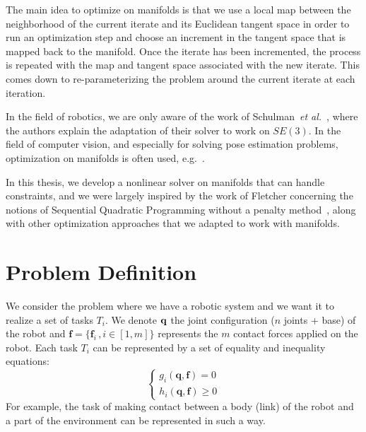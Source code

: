 The main idea to optimize on manifolds is that we use a local map between the neighborhood of the current iterate and its Euclidean tangent space in order to run an optimization step and choose an increment in the tangent space that is mapped back to the manifold.
Once the iterate has been incremented, the process is repeated with the map and tangent space associated with the new iterate.
This comes down to re-parameterizing the problem around the current iterate at each iteration.

In the field of robotics, we are only aware of the work of Schulman~\emph{et al.}~\cite{Schulman2014}, where the authors explain the adaptation of their solver to work on $SE(3)$.
In the field of computer vision, and especially for solving pose estimation problems, optimization on manifolds is often used, e.g.~\cite{hertzberg2011, lu2000fast}.

In this thesis, we develop a nonlinear solver on manifolds that can handle constraints, and we were largely inspired by the work of Fletcher concerning the notions of Sequential Quadratic Programming without a penalty method~\cite{Fletcher:ifip:2006, fletcher2010sequential, fletcher:mathprog:2000}, along with other optimization approaches that we adapted to work with manifolds.

\section{Problem Definition}
\label{sec:problem_definition}


We consider the problem where we have a robotic system and we want it to realize a set of tasks $T_i$.
We denote $\bf q$ the joint configuration ($n$ joints + base) of the robot and $\mathbf{f} =\{\mathbf{f}_i\,, i\in[1,m]\}$ represents the $m$ contact forces applied on the robot.
Each task $T_i$ can be represented by a set of equality and inequality equations:
\begin{equation}
  \left\{
    \begin{aligned}
    g_i(\mathbf{q},\mathbf{f}) = 0\\
    h_i(\mathbf{q},\mathbf{f}) \geq 0
    \end{aligned}
  \right.
\end{equation}
For example, the task of making contact between a body (link) of the robot and a part of the environment can be represented in such a way.

